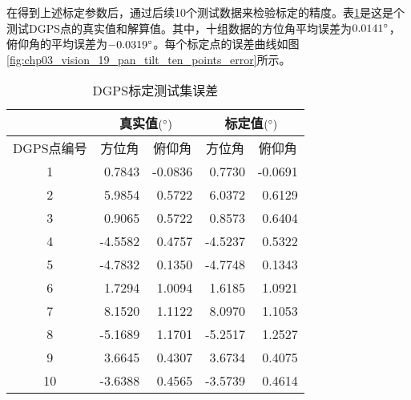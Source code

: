 在得到上述标定参数后，通过后续10个测试数据来检验标定的精度。表\ref{label:DGPS_Pan_Tilit_Calibration_Error}是这是个测试DGPS点的真实值和解算值。其中，十组数据的方位角平均误差为$0.0141\degree$，俯仰角的平均误差为$-0.0319\degree$。每个标定点的误差曲线如图\ref{fig:chp03_vision_19_pan_tilt_ten_points_error}所示。

\begin{table}[]
	\centering
	\caption{DGPS标定测试集误差}
	\label{label:DGPS_Pan_Tilit_Calibration_Error}
	\begin{tabular}{crrrr}
		\hline
		& \multicolumn{2}{c}{真实值$(\degree)$}                           & \multicolumn{2}{c}{标定值$(\degree)$}                           \\ \hline
		DGPS点编号 & \multicolumn{1}{c}{方位角} & \multicolumn{1}{c}{俯仰角} & \multicolumn{1}{c}{方位角} & \multicolumn{1}{c}{俯仰角} \\ \hline
		1       & 0.7843                  & -0.0836                 & 0.7730                  & -0.0691                 \\
		2       & 5.9854                  & 0.5722                  & 6.0372                  & 0.6129                  \\
		3       & 0.9065                  & 0.5722                  & 0.8573                  & 0.6404                  \\
		4       & -4.5582                 & 0.4757                 & -4.5237                 & 0.5322                  \\
		5       & -4.7832                 & 0.1350                  & -4.7748                 & 0.1343                  \\
		6       & 1.7294                  & 1.0094                  & 1.6185                  & 1.0921                  \\
		7       & 8.1520                  & 1.1122                  & 8.0970                  & 1.1053                  \\
		8       & -5.1689                 & 1.1701                  & -5.2517                 & 1.2527                  \\
		9       & 3.6645                  & 0.4307                  & 3.6734                  & 0.4075                  \\
		10      & -3.6388                 & 0.4565                  & -3.5739                 & 0.4614                  \\ \hline
	\end{tabular}
\end{table}


